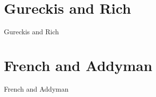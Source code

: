 \documentclass[jou]{apa6}
\begin{document}
\section{Gureckis and Rich}
Gureckis and Rich 

\section{French and Addyman}
French and Addyman




\hspace*{1cm}
\end{document}
